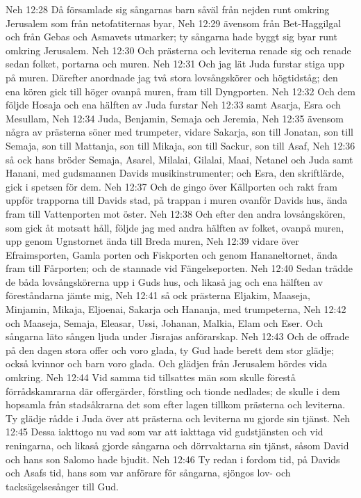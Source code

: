 Neh 12:28  Då församlade sig sångarnas barn såväl från nejden runt omkring Jerusalem som från netofatiternas byar,
Neh 12:29  ävensom från Bet-Haggilgal och från Gebas och Asmavets utmarker; ty sångarna hade byggt sig byar runt omkring Jerusalem.
Neh 12:30  Och prästerna och leviterna renade sig och renade sedan folket, portarna och muren.
Neh 12:31  Och jag lät Juda furstar stiga upp på muren. Därefter anordnade jag två stora lovsångskörer och högtidståg; den ena kören gick till höger ovanpå muren, fram till Dyngporten.
Neh 12:32  Och dem följde Hosaja och ena hälften av Juda furstar
Neh 12:33  samt Asarja, Esra och Mesullam,
Neh 12:34  Juda, Benjamin, Semaja och Jeremia,
Neh 12:35  ävensom några av prästerna söner med trumpeter, vidare Sakarja, son till Jonatan, son till Semaja, son till Mattanja, son till Mikaja, son till Sackur, son till Asaf,
Neh 12:36  så ock hans bröder Semaja, Asarel, Milalai, Gilalai, Maai, Netanel och Juda samt Hanani, med gudsmannen Davids musikinstrumenter; och Esra, den skriftlärde, gick i spetsen för dem.
Neh 12:37  Och de gingo över Källporten och rakt fram uppför trapporna till Davids stad, på trappan i muren ovanför Davids hus, ända fram till Vattenporten mot öster.
Neh 12:38  Och efter den andra lovsångskören, som gick åt motsatt håll, följde jag med andra hälften av folket, ovanpå muren, upp genom Ugnstornet ända till Breda muren,
Neh 12:39  vidare över Efraimsporten, Gamla porten och Fiskporten och genom Hananeltornet, ända fram till Fårporten; och de stannade vid Fängelseporten.
Neh 12:40  Sedan trädde de båda lovsångskörerna upp i Guds hus, och likaså jag och ena hälften av föreståndarna jämte mig,
Neh 12:41  så ock prästerna Eljakim, Maaseja, Minjamin, Mikaja, Eljoenai, Sakarja och Hananja, med trumpeterna,
Neh 12:42  och Maaseja, Semaja, Eleasar, Ussi, Johanan, Malkia, Elam och Eser. Och sångarna läto sången ljuda under Jisrajas anförarskap.
Neh 12:43  Och de offrade på den dagen stora offer och voro glada, ty Gud hade berett dem stor glädje; också kvinnor och barn voro glada. Och glädjen från Jerusalem hördes vida omkring.
Neh 12:44  Vid samma tid tillsattes män som skulle förestå förrådskamrarna där offergärder, förstling och tionde nedlades; de skulle i dem hopsamla från stadsåkrarna det som efter lagen tillkom prästerna och leviterna. Ty glädje rådde i Juda över att prästerna och leviterna nu gjorde sin tjänst.
Neh 12:45  Dessa iakttogo nu vad som var att iakttaga vid gudstjänsten och vid reningarna, och likaså gjorde sångarna och dörrvaktarna sin tjänst, såsom David och hans son Salomo hade bjudit.
Neh 12:46  Ty redan i fordom tid, på Davids och Asafs tid, hans som var anförare för sångarna, sjöngos lov- och tacksägelsesånger till Gud.

